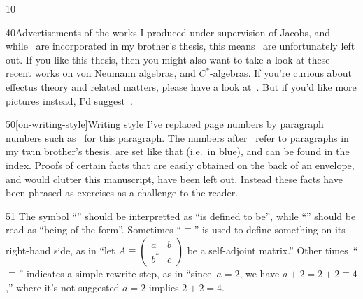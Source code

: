 \documentclass[b5paper]{book}
\begin{document}
\begin{parsec}{10}
\begin{point}{40}{Advertisements}
\cite{model,cho2015quotient,cho2016duplicable,qpakm,westerbaan2016universal}
of the works
I produced under supervision of Jacobs,
and while~\cite{wwpaschke,effintro,statesofconvexsets}
are incorporated in my brother's thesis,
this means~\cite{jacobs2015effect,jacobs2017distances} 
are unfortunately left out.
If you like this thesis,
then
you might also want to take a look
at these~\cite{rennela2017infinite,
rennela2015complete,
furber2013kleisli,
kornell2012,
heunen2015domains,
Maassen2010} recent works on von Neumann algebras,
and $C^*$-algebras.
If you're curious
about effectus theory
and related matters,
please have a look at~\cite{jacobs2017quantum,
cho2017disintegration,
jacobs2016hyper,
jacobs2017channel,
jacobs2017formal,
cho2017efprob,
jacobs2017probability,
jacobs2017recipe,
jacobs2016effectuses,
jacobs2016affine,
jacobs2016relating,
effintro,
statesofconvexsets,
cho2015quotient,
jacobs2017distances,
jacobs2015effect,
jacobs2016expectation,
jacobs2016predicate,
newdirections}.
But if you'd like more pictures instead,
I'd suggest~\cite{coecke2017picturing}.
\end{point}
\begin{point}{50}[on-writing-style]{Writing style}
I've replaced page numbers by
paragraph numbers
such as~
for this paragraph.
The numbers after~ refer to paragraphs
	in my twin brother's thesis\cite{bas}.
 are set like that
(i.e.~in blue),
and can be found in the index.
Proofs of certain facts
that are easily obtained on the back of an envelope,
and would clutter this manuscript,
have been left out.
Instead these facts have been phrased as exercises
as a challenge to the reader.
\end{point}
\begin{point}{51}
    The symbol ``\Define{$:=$}''
should be interpretted as ``is defined to be'',
    while ``\Define{$\equiv$}''
should be read as ``being of the form''.
Sometimes ``$\equiv$'' is
used to define something on its right-hand side,
as in ``let $A\equiv\left(
\begin{smallmatrix} a&b\\b^* &c\end{smallmatrix}
\right)$ be a self-adjoint matrix.''
Other times~``$\equiv$''
indicates a simple rewrite step, as in
``since~$a=2$, we have $a+2=2+2\equiv 4$,''
where it's not suggested $a=2$ implies $2+2=4$.
\end{point}

\end{parsec}
\end{document}
